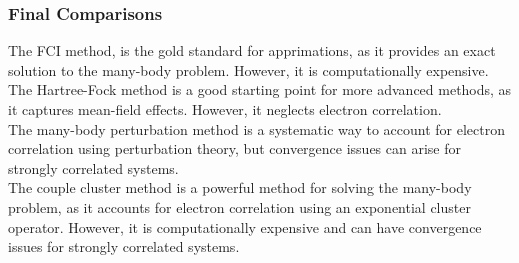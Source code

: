 \documentclass[UKenglish,aspectratio=169,12pt]{beamer}
\begin{document}
\begin{frame}
  \frametitle{Final Comparisons}
    The FCI method, is the gold standard for apprimations, as it provides an exact solution to the many-body problem. However, it is computationally expensive.\\
    The Hartree-Fock method is a good starting point for more advanced methods, as it captures mean-field effects. However, it neglects electron correlation.\\
    The many-body perturbation method is a systematic way to account for electron correlation using perturbation theory, but convergence issues can arise for strongly correlated systems.\\
    The couple cluster method is a powerful method for solving the many-body problem, as it accounts for electron correlation using an exponential cluster operator. However, it is computationally expensive and can have convergence issues for strongly correlated systems.
\end{frame}
\end{document}
